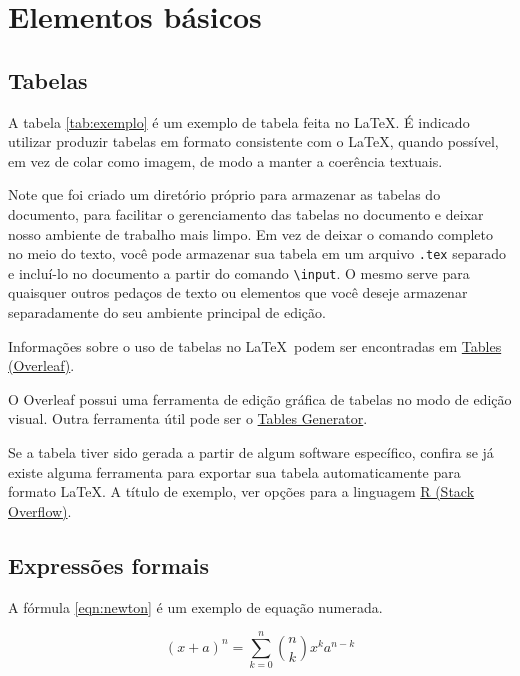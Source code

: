 \chapter{Elementos básicos}

\section{Tabelas}\label{sec:tabelas}
A tabela \ref{tab:exemplo} é um exemplo de tabela feita no \LaTeX. É indicado utilizar produzir tabelas em formato consistente com o \LaTeX, quando possível, em vez de colar como imagem, de modo a manter a coerência textuais.

Note que foi criado um diretório próprio para armazenar as tabelas do documento, para facilitar o gerenciamento das tabelas no documento e deixar nosso ambiente de trabalho mais limpo. Em vez de deixar o comando completo no meio do texto, você pode armazenar sua tabela em um arquivo \texttt{.tex} separado e incluí-lo no documento a partir do comando \texttt{\textbackslash input}. O mesmo serve para quaisquer outros pedaços de texto ou elementos que você deseje armazenar separadamente do seu ambiente principal de edição.



Informações sobre o uso de tabelas no \LaTeX\ podem ser encontradas em \href{https://www.overleaf.com/learn/latex/Tables}{Tables (Overleaf)}.

O Overleaf possui uma ferramenta de edição gráfica de tabelas no modo de edição visual. Outra ferramenta útil pode ser o \href{https://www.tablesgenerator.com/}{Tables Generator}.

Se a tabela tiver sido gerada a partir de algum software específico, confira se já existe alguma ferramenta para exportar sua tabela automaticamente para formato \LaTeX. A título de exemplo, ver opções para a linguagem \href{https://stackoverflow.com/questions/5465314/tools-for-making-latex-tables-in-r}{R (Stack Overflow)}.

\section{Expressões formais}
A fórmula \ref{eqn:newton} é um exemplo de equação numerada.

\begin{equation}
(x + a)^n = \sum_{k=0}^n \binom{n}{k} x^k a^{n - k}
\label{eqn:newton}
\end{equation}

